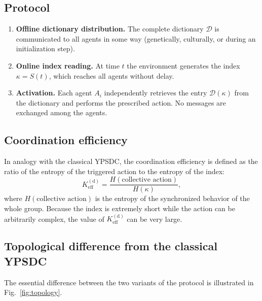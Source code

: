 \documentclass[12pt,a4paper]{article}
\begin{document}
	\subsection{Protocol}
	
	\begin{enumerate}[leftmargin=*, label=\textbf{Phase \arabic*:}]
		\item \textbf{Offline dictionary distribution.} The complete dictionary \(\mathcal{D}\) is communicated to all agents in some way (genetically, culturally, or during an initialization step).
		\item \textbf{Online index reading.} At time \(t\) the environment generates the index \(\kappa = S(t)\), which reaches all agents without delay.
		\item \textbf{Activation.} Each agent \(A_i\) independently retrieves the entry \(\mathcal{D}(\kappa)\) from the dictionary and performs the prescribed action. No messages are exchanged among the agents.
	\end{enumerate}
	
	\subsection{Coordination efficiency}
	
	In analogy with the classical YPSDC, the coordination efficiency is defined as the ratio of the entropy of the triggered action to the entropy of the index:
	\begin{equation}
		K_{\mathrm{eff}}^{\mathrm{(d)}} = \frac{H(\text{collective action})}{H(\kappa)},
		\label{eq:Keff_d}
	\end{equation}
	where \(H(\text{collective action})\) is the entropy of the synchronized behavior of the whole group. Because the index is extremely short while the action can be arbitrarily complex, the value of \(K_{\mathrm{eff}}^{\mathrm{(d)}}\) can be very large.
	
	\subsection{Topological difference from the classical YPSDC}
	
	The essential difference between the two variants of the protocol is illustrated in Fig.~\ref{fig:topology}.
	
\end{document}
